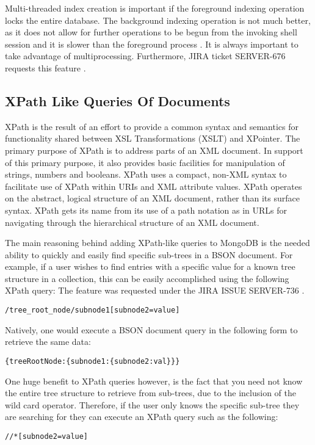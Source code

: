 \documentclass{dependencies/acm_proc_article-sp}
\begin{document}
Multi-threaded index creation is important if the foreground indexing operation locks the entire database.  The background indexing operation is not much better, as it does not allow for further operations to be begun from the invoking shell session and it is slower than the foreground process \cite{17}.  It is always important to take advantage of multiprocessing.
Furthermore, JIRA ticket SERVER-676 requests this feature \cite{8}.

\subsection{XPath Like Queries Of Documents}
XPath is the result of an effort to provide a common syntax and semantics for functionality shared between XSL Transformations (XSLT) and XPointer.
The primary purpose of XPath is to address parts of an XML document\cite{10}.
In support of this primary purpose, it also provides basic facilities for manipulation of strings, numbers and booleans.
XPath uses a compact, non-XML syntax to facilitate use of XPath within URIs and XML attribute values.
XPath operates on the abstract, logical structure of an XML document, rather than its surface syntax.
XPath gets its name from its use of a path notation as in URLs for navigating through the hierarchical structure of an XML document.

The main reasoning behind adding XPath-like queries to MongoDB is the needed ability to quickly and easily find specific sub-trees in a BSON document.
For example, if a user wishes to find entries with a specific value for a known tree structure in a collection, this can be easily accomplished using the following XPath query:
The feature was requested under the JIRA ISSUE SERVER-736 \cite{15}.

\begin{lstlisting}
/tree_root_node/subnode1[subnode2=value]
\end{lstlisting}
Natively, one would execute a BSON document query in the following form to retrieve the same data:
\begin{lstlisting}
{treeRootNode:{subnode1:{subnode2:val}}}
\end{lstlisting}
One huge benefit to XPath queries however, is the fact that you need not know the entire tree structure to retrieve from sub-trees, due to the inclusion of the wild card operator.
Therefore, if the user only knows the specific sub-tree they are searching for they can execute an XPath query such as the following:
\begin{lstlisting}
//*[subnode2=value]
\end{lstlisting}
\end{document}
